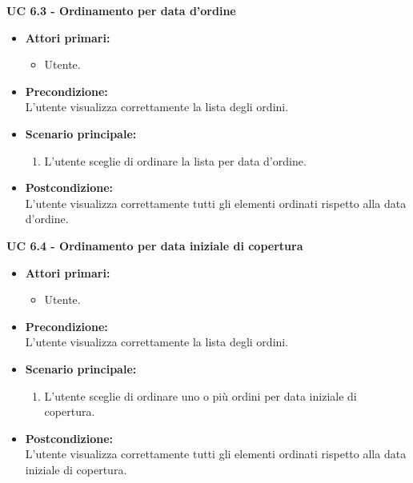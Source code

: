 \vspace{0.4cm}

\noindent \textbf{\large UC 6.3 - Ordinamento per data d'ordine }
\label{uc:ordinamento-data-ordine}
\begin{itemize}

	\item \textbf{Attori primari: }
		\begin{itemize}
			\item Utente.
		\end{itemize}

	\item \textbf{Precondizione: }\\[0.3cm]
		L'utente visualizza correttamente la lista degli ordini.

	\item \textbf{Scenario principale: }
		\begin{enumerate}
			\item L'utente sceglie di ordinare la lista per data d'ordine.
		\end{enumerate}
		

	\item \textbf{Postcondizione: }\\[0.3cm]
		L'utente visualizza correttamente tutti gli elementi ordinati rispetto alla data d'ordine.

\end{itemize}

\vspace{0.4cm}

\noindent \textbf{\large UC 6.4 - Ordinamento per data iniziale di copertura }
\label{uc:ordinamento-data-iniziale-copertura}
\begin{itemize}

	\item \textbf{Attori primari: }
		\begin{itemize}
			\item Utente.
		\end{itemize}

	\item \textbf{Precondizione: }\\[0.3cm]
		L'utente visualizza correttamente la lista degli ordini.

	\item \textbf{Scenario principale: }
		\begin{enumerate}
			\item L'utente sceglie di ordinare uno o più ordini per data iniziale di copertura.
		\end{enumerate}
		

	\item \textbf{Postcondizione: }\\[0.3cm]
		L'utente visualizza correttamente tutti gli elementi ordinati rispetto alla data iniziale di copertura.

\end{itemize}

